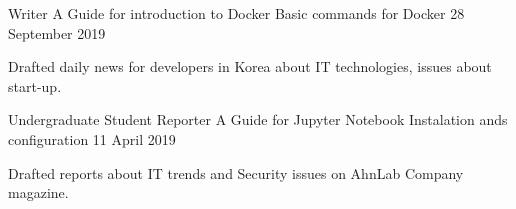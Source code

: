 \begin{cventries}
  \cventry
    {Writer}
    {A Guide for introduction to Docker}
    {Basic commands for Docker}
    {28 September 2019}
    {
      \begin{cvitems}
        \item {Drafted daily news for developers in Korea about IT technologies, issues about start-up.}
      \end{cvitems}
    }
  \cventry
    {Undergraduate Student Reporter}
    {A Guide for Jupyter Notebook}
    {Instalation ands configuration}
    {11 April 2019 }
    {
      \begin{cvitems}
        \item {Drafted reports about IT trends and Security issues on AhnLab Company magazine.}
      \end{cvitems}
    }
\end{cventries}
